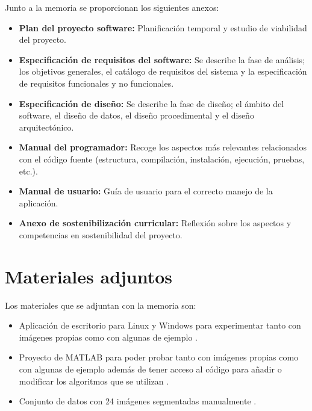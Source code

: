 Junto a la memoria se proporcionan los siguientes anexos:

\begin{itemize}
    \tightlist
        \item
            \textbf{Plan del proyecto software:} Planificación temporal y estudio de viabilidad del proyecto.
        \item
            \textbf{Especificación de requisitos del software:} Se describe la fase de análisis; los objetivos generales, el catálogo de requisitos del sistema y la especificación de requisitos funcionales y no funcionales.
        \item
            \textbf{Especificación de diseño:} Se describe la fase de diseño; el ámbito del software, el diseño de datos, el diseño procedimental y el diseño arquitectónico.
        \item
            \textbf{Manual del programador:} Recoge los aspectos más relevantes relacionados con el código fuente (estructura, compilación, instalación, ejecución, pruebas, etc.).
        \item
            \textbf{Manual de usuario:} Guía de usuario para el correcto manejo de la aplicación.
        \item 
            \textbf{Anexo de sostenibilización curricular:} Reflexión sobre los aspectos y competencias en sostenibilidad del proyecto.
\end{itemize}

\section{Materiales adjuntos}\label{materiales-adjuntos}

Los materiales que se adjuntan con la memoria son: 

\begin{itemize}
    \tightlist
        \item
            Aplicación de escritorio para Linux y Windows para experimentar tanto con imágenes propias como con algunas de ejemplo \cite{releaseInvIPM}.
        \item
            Proyecto de MATLAB para poder probar tanto con imágenes propias como con algunas de ejemplo además de tener acceso al código para añadir o modificar los algoritmos que se utilizan \cite{githubInvIPM}.
        \item 
            Conjunto de datos con 24 imágenes segmentadas manualmente \cite{segManualInvIPM}.
\end{itemize}
